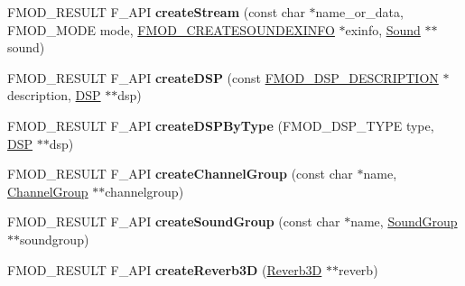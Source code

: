 \begin{DoxyCompactItemize}
\item 
\hypertarget{class_f_m_o_d_1_1_system_accec6ee2c51fccf5091098658b65491c}{F\+M\+O\+D\+\_\+\+R\+E\+S\+U\+L\+T F\+\_\+\+A\+P\+I {\bfseries create\+Stream} (const char $\ast$name\+\_\+or\+\_\+data, F\+M\+O\+D\+\_\+\+M\+O\+D\+E mode, \hyperlink{struct_f_m_o_d___c_r_e_a_t_e_s_o_u_n_d_e_x_i_n_f_o}{F\+M\+O\+D\+\_\+\+C\+R\+E\+A\+T\+E\+S\+O\+U\+N\+D\+E\+X\+I\+N\+F\+O} $\ast$exinfo, \hyperlink{class_f_m_o_d_1_1_sound}{Sound} $\ast$$\ast$sound)}\label{class_f_m_o_d_1_1_system_accec6ee2c51fccf5091098658b65491c}

\item 
\hypertarget{class_f_m_o_d_1_1_system_a0b150ee5db127c245ae98285d2713326}{F\+M\+O\+D\+\_\+\+R\+E\+S\+U\+L\+T F\+\_\+\+A\+P\+I {\bfseries create\+D\+S\+P} (const \hyperlink{struct_f_m_o_d___d_s_p___d_e_s_c_r_i_p_t_i_o_n}{F\+M\+O\+D\+\_\+\+D\+S\+P\+\_\+\+D\+E\+S\+C\+R\+I\+P\+T\+I\+O\+N} $\ast$description, \hyperlink{class_f_m_o_d_1_1_d_s_p}{D\+S\+P} $\ast$$\ast$dsp)}\label{class_f_m_o_d_1_1_system_a0b150ee5db127c245ae98285d2713326}

\item 
\hypertarget{class_f_m_o_d_1_1_system_ab3a4c98eb70da7e96866b0f40f5cbd22}{F\+M\+O\+D\+\_\+\+R\+E\+S\+U\+L\+T F\+\_\+\+A\+P\+I {\bfseries create\+D\+S\+P\+By\+Type} (F\+M\+O\+D\+\_\+\+D\+S\+P\+\_\+\+T\+Y\+P\+E type, \hyperlink{class_f_m_o_d_1_1_d_s_p}{D\+S\+P} $\ast$$\ast$dsp)}\label{class_f_m_o_d_1_1_system_ab3a4c98eb70da7e96866b0f40f5cbd22}

\item 
\hypertarget{class_f_m_o_d_1_1_system_af4d7063579a60c8986eb8bb1f67e7f2c}{F\+M\+O\+D\+\_\+\+R\+E\+S\+U\+L\+T F\+\_\+\+A\+P\+I {\bfseries create\+Channel\+Group} (const char $\ast$name, \hyperlink{class_f_m_o_d_1_1_channel_group}{Channel\+Group} $\ast$$\ast$channelgroup)}\label{class_f_m_o_d_1_1_system_af4d7063579a60c8986eb8bb1f67e7f2c}

\item 
\hypertarget{class_f_m_o_d_1_1_system_adac6229aff0ac7480c50988d753df46f}{F\+M\+O\+D\+\_\+\+R\+E\+S\+U\+L\+T F\+\_\+\+A\+P\+I {\bfseries create\+Sound\+Group} (const char $\ast$name, \hyperlink{class_f_m_o_d_1_1_sound_group}{Sound\+Group} $\ast$$\ast$soundgroup)}\label{class_f_m_o_d_1_1_system_adac6229aff0ac7480c50988d753df46f}

\item 
\hypertarget{class_f_m_o_d_1_1_system_aedd7913fc01f33f89a399295dc4b0ea4}{F\+M\+O\+D\+\_\+\+R\+E\+S\+U\+L\+T F\+\_\+\+A\+P\+I {\bfseries create\+Reverb3\+D} (\hyperlink{class_f_m_o_d_1_1_reverb3_d}{Reverb3\+D} $\ast$$\ast$reverb)}\label{class_f_m_o_d_1_1_system_aedd7913fc01f33f89a399295dc4b0ea4}


\end{DoxyCompactItemize}
